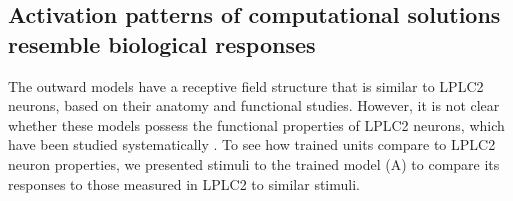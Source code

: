 \documentclass[pdftex,9pt,lineno]{elife}
\begin{document}
\begin{figure}
\label{figsupp:sf1}
\end{figure}

\subsection{Activation patterns of computational solutions resemble biological responses}

The outward models have a receptive field structure that is similar to LPLC2 neurons, based on their anatomy and functional studies. However, it is not clear whether these models possess the functional properties of LPLC2 neurons, which have been studied systematically \citep{klapoetke2017ultra,von2017feature,ache2019neural}. To see how trained units compare to LPLC2 neuron properties, we presented stimuli to the trained model (A) to compare its responses to those measured in LPLC2 to similar stimuli.
\end{document}
